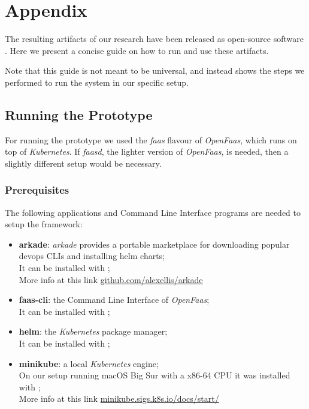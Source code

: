 \chapter{Appendix}

The resulting artifacts of our research have been released as open-source software \cite{thesis-github}. Here we present a concise guide on how to run and use these artifacts.

Note that this guide is not meant to be universal, and instead shows the steps we performed to run the system in our specific setup.

\section{Running the Prototype}
For running the prototype we used the \textit{faas} flavour of \textit{OpenFaas}, which runs on top of \textit{Kubernetes}. If \textit{faasd}, the lighter version of \textit{OpenFaas}, is needed, then a slightly different setup would be necessary.


\subsection{Prerequisites}
The following applications and Command Line Interface programs are needed to setup the framework:
\begin{itemize}
    \item \textbf{arkade}: \textit{arkade} provides a portable marketplace for downloading popular devops CLIs and installing helm charts;
    \\It can be installed with ;
    \\More info at this link \href{https://github.com/alexellis/arkade}{github.com/alexellis/arkade}
    
    \item \textbf{faas-cli}: the Command Line Interface of \textit{OpenFaas};
    \\It can be installed with ;
    
    \item \textbf{helm}: the \textit{Kubernetes} package manager;
    \\It can be installed with ;
    
    \item \textbf{minikube}: a local \textit{Kubernetes} engine;
    \\On our setup running macOS Big Sur with a x86-64 CPU it was installed with ;
    \\More info at this link \href{https://minikube.sigs.k8s.io/docs/start/}{minikube.sigs.k8s.io/docs/start/}
\end{itemize}


